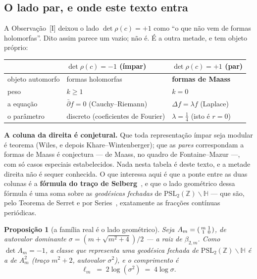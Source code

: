 \documentclass[11pt,a4paper]{article}
\theoremstyle{plain}
\newtheorem{proposicao}[teorema]{Proposição}
\theoremstyle{definition}
\theoremstyle{remark}
\newcommand{\Z}{\mathbb{Z}}
\newcommand{\PSL}{\mathrm{PSL}}
\newcommand{\Hyp}{\mathbb{H}}
\begin{document}
\subsection{O lado par, e onde este texto entra}\label{sec:par}

A Observação~[I] deixou o lado $\det\rho(c)=+1$ como ``o que não vem de formas
holomorfas''. Dito assim parece um vazio; não é. É a outra metade, e tem objeto próprio:

\begin{center}\small
\begin{tabular}{lll}
\hline
 & $\det\rho(c)=-1$ (ímpar) & $\det\rho(c)=+1$ (par) \\ \hline
objeto automorfo & formas holomorfas & \textbf{formas de Maass} \\
peso & $k\geq1$ & $k=0$ \\
a equação & $\bar\partial f = 0$ (Cauchy--Riemann) & $\Delta f = \lambda f$ (Laplace) \\
o parâmetro & discreto (coeficientes de Fourier) & $\lambda = \tfrac14$ (isto é $r=0$) \\
\hline
\end{tabular}
\end{center}

\noindent \textbf{A coluna da direita é conjetural.} Que toda representação ímpar seja modular é
teorema (Wiles, e depois Khare--Wintenberger); que as \emph{pares} correspondam a formas de Maass
é conjectura --- de Maass, no quadro de Fontaine--Mazur ---, com só casos especiais estabelecidos.
Nada nesta tabela é deste texto, e a metade direita não é sequer conhecida. O que interessa aqui é que a ponte entre as duas colunas é a
\textbf{fórmula do traço de Selberg}~\cite{selberg1956}, e que o lado geométrico dessa fórmula é
uma soma sobre as \emph{geodésicas fechadas} de $\PSL_2(\Z)\backslash\Hyp$ --- que são, pelo
Teorema de Serret e por Series~\cite{series1985}, exatamente as fracções contínuas periódicas.

\begin{proposicao}[a família real é o lado geométrico]\label{prop:selberg}
Seja $A_m=\begin{psmallmatrix}m&1\\1&0\end{psmallmatrix}$, de autovalor dominante
$\sigma = (m+\sqrt{m^2+4})/2$ --- a raiz de $\beta_{2,m}$. Como $\det A_m = -1$, a classe que
representa uma geodésica fechada de $\PSL_2(\Z)\backslash\Hyp$ é a de $A_m^2$ (traço $m^2+2$,
autovalor $\sigma^2$), e o comprimento é
\[
  \ell_m \;=\; 2\log(\sigma^2) \;=\; 4\log\sigma .
\]
\end{proposicao}
\end{document}
